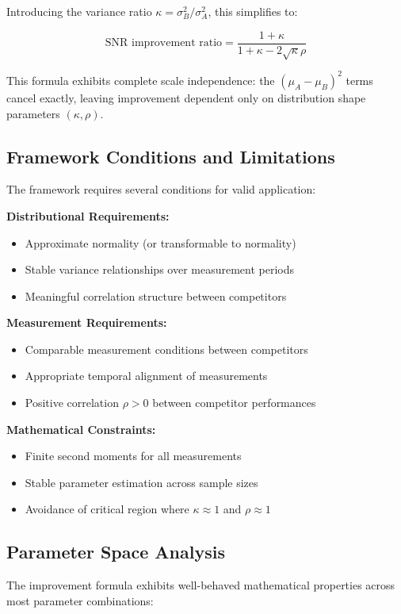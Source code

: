 Introducing the variance ratio $\kappa = \sigma_B^2/\sigma_A^2$, this simplifies to:

$$\text{SNR improvement ratio} = \frac{1 + \kappa}{1 + \kappa - 2\sqrt{\kappa}\rho}$$

This formula exhibits complete scale independence: the $(\mu_A - \mu_B)^2$ terms cancel exactly, leaving improvement dependent only on distribution shape parameters $(\kappa, \rho)$.

\subsection{Framework Conditions and Limitations}

The framework requires several conditions for valid application:

\textbf{Distributional Requirements:}
\begin{itemize}
    \item Approximate normality (or transformable to normality)
    \item Stable variance relationships over measurement periods
    \item Meaningful correlation structure between competitors
\end{itemize}

\textbf{Measurement Requirements:}
\begin{itemize}
    \item Comparable measurement conditions between competitors
    \item Appropriate temporal alignment of measurements
    \item Positive correlation $\rho > 0$ between competitor performances
\end{itemize}

\textbf{Mathematical Constraints:}
\begin{itemize}
    \item Finite second moments for all measurements
    \item Stable parameter estimation across sample sizes
    \item Avoidance of critical region where $\kappa \approx 1$ and $\rho \approx 1$
\end{itemize}

\subsection{Parameter Space Analysis}

The improvement formula exhibits well-behaved mathematical properties across most parameter combinations:

